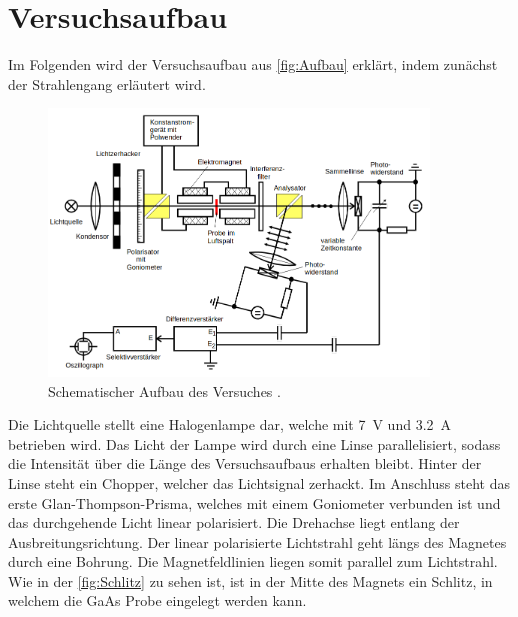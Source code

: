 %

%
\section{Versuchsaufbau}
Im Folgenden wird der Versuchsaufbau aus \autoref{fig:Aufbau} erklärt, indem zunächst der Strahlengang erläutert wird.\\

\begin{figure}[H]
    \centering
    \includegraphics[width=0.9\textwidth]{content/Aufbau.png}
    \caption{Schematischer Aufbau des Versuches \cite{Versuchsanleitung_v46}.}
    \label{fig:Aufbau}
\end{figure}

\noindent Die Lichtquelle stellt eine Halogenlampe dar, welche mit \qty{7}{\volt} und \qty{3.2}{\ampere} betrieben wird.
Das Licht der Lampe wird durch eine Linse parallelisiert, sodass die Intensität über die Länge des Versuchsaufbaus erhalten bleibt. 
Hinter der Linse steht ein Chopper, welcher das Lichtsignal zerhackt. Im Anschluss steht das erste Glan-Thompson-Prisma, welches mit 
einem Goniometer verbunden ist und das durchgehende Licht linear polarisiert. Die Drehachse liegt entlang der Ausbreitungsrichtung. 
Der linear polarisierte Lichtstrahl geht längs des Magnetes durch eine Bohrung. Die Magnetfeldlinien liegen somit parallel zum 
Lichtstrahl. Wie in der \autoref{fig:Schlitz} zu sehen ist, ist in der Mitte des Magnets ein Schlitz, in welchem die GaAs Probe eingelegt 
werden kann.

